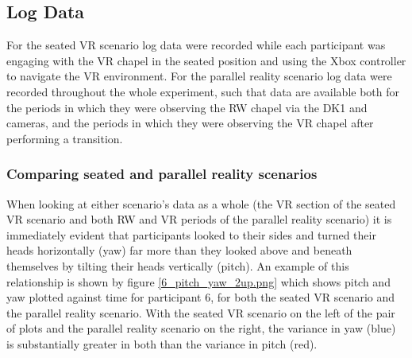 
\subsection{Log Data}

For the seated VR scenario log data were recorded while each participant was engaging with the VR chapel in the seated position and using the Xbox controller to navigate the VR environment. For the parallel reality scenario log data were recorded throughout the whole experiment, such that data are available both for the periods in which they were observing the RW chapel via the DK1 and cameras, and the periods in which they were observing the VR chapel after performing a transition.



\subsubsection{Comparing seated and parallel reality scenarios}
\label{stage1-seated-vs-parallel-reality}
When looking at either scenario's data as a whole (the VR section of the seated VR scenario and both RW and VR periods of the parallel reality scenario) it is immediately evident that participants looked to their sides and turned their heads horizontally (yaw) far more than they looked above and beneath themselves by tilting their heads vertically (pitch). An example of this relationship is shown by figure \ref{6_pitch_yaw_2up.png} which shows pitch and yaw plotted against time for participant 6, for both the seated VR scenario and the parallel reality scenario. With the seated VR scenario on the left of the pair of plots and the parallel reality scenario on the right, the variance in yaw (blue) is substantially greater in both than the variance in pitch (red).

